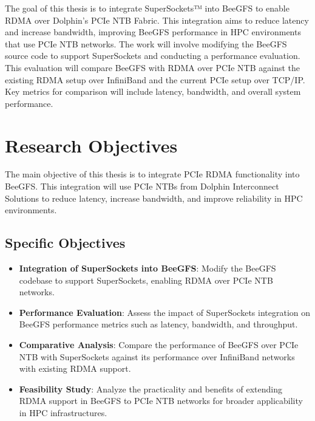 The goal of this thesis is to integrate SuperSockets™ into BeeGFS to enable RDMA over Dolphin’s PCIe NTB Fabric. This integration aims to reduce latency and increase bandwidth, improving BeeGFS performance in HPC environments that use PCIe NTB networks. The work will involve modifying the BeeGFS source code to support SuperSockets and conducting a performance evaluation. This evaluation will compare BeeGFS with RDMA over PCIe NTB against the existing RDMA setup over InfiniBand and the current PCIe setup over TCP/IP. Key metrics for comparison will include latency, bandwidth, and overall system performance.

\section{Research Objectives}
The main objective of this thesis is to integrate PCIe RDMA functionality into BeeGFS. This integration will use PCIe NTBs from Dolphin Interconnect Solutions to reduce latency, increase bandwidth, and improve reliability in HPC environments.

\subsection{Specific Objectives}
\begin{itemize}
    \item \textbf{Integration of SuperSockets into BeeGFS}: Modify the BeeGFS codebase to support SuperSockets, enabling RDMA over PCIe NTB networks.
    \item \textbf{Performance Evaluation}: Assess the impact of SuperSockets integration on BeeGFS performance metrics such as latency, bandwidth, and throughput.
    \item \textbf{Comparative Analysis}: Compare the performance of BeeGFS over PCIe NTB with SuperSockets against its performance over InfiniBand networks with existing RDMA support.
    \item \textbf{Feasibility Study}: Analyze the practicality and benefits of extending RDMA support in BeeGFS to PCIe NTB networks for broader applicability in HPC infrastructures.
\end{itemize}

